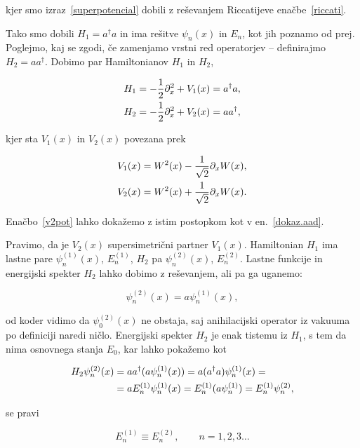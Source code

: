 \ni kjer smo izraz~\eqref{superpotencial} dobili z re\v sevanjem Riccatijeve ena\v cbe~\eqref{riccati}.

Tako smo dobili $H_1 = a^\dagger a$ in ima re\v sitve $\psi_n(x)$ in $E_n$, kot jih poznamo
od prej. Poglejmo, kaj se zgodi, \v ce zamenjamo vrstni red operatorjev -- definirajmo $H_2 = aa^\dagger$.
Dobimo par Hamiltonianov $H_1$ in $H_2$,

\begin{align}
	H_1 &= -\frac{1}{2}\partial_x^2 + V_1(x) = a^\dagger a, \\
	H_2 &= -\frac{1}{2}\partial_x^2 + V_2(x) = aa^\dagger,
\end{align}

\ni kjer sta $V_1(x)$ in $V_2(x)$ povezana prek

\begin{align}
	V_1(x) &= W^2(x) - \frac{1}{\sqrt{2}}\partial_x W(x), \notag \\
	V_2(x) &= W^2(x) + \frac{1}{\sqrt{2}}\partial_x W(x). \label{v2pot}
\end{align}

\ni Ena\v cbo~\eqref{v2pot} lahko doka\v zemo z istim postopkom kot v en.~\eqref{dokaz.aad}.

Pravimo, da je $V_2(x)$ supersimetri\v cni partner $V_1(x)$. Hamiltonian $H_1$ ima lastne pare $\psi^{(1)}_n(x)$,
$E^{(1)}_n$, $H_2$ pa $\psi^{(2)}_n(x)$, $E^{(2)}_n$. Lastne funkcije in energijski spekter $H_2$ lahko dobimo z
re\v sevanjem, ali pa ga uganemo:

\begin{equation}
	\psi^{(2)}_n(x) = a\psi^{(1)}_n(x),
\end{equation}

\ni od koder vidimo da $\psi^{(2)}_0(x)$ ne obstaja, saj anihilacijski operator iz vakuuma po definiciji naredi
ni\v clo. Energijski spekter $H_2$ je enak tistemu iz $H_1$, s tem da nima osnovnega stanja $E_0$, kar lahko
poka\v zemo kot

\begin{align}
	H_2\psi^{(2)}_n(x) &= aa^\dagger (a\psi^{(1)}_n(x)) = a(a^\dagger a)\psi^{(1)}_n(x) = \notag \\
		&= aE^{(1)}_n\psi^{(1)}_n(x) = E_n^{(1)}(a\psi_n^{(1)}) = E_n^{(1)}\psi_n^{(2)},
	\label{degenener}
\end{align}

\ni se pravi

\begin{equation}
	E^{(1)}_n \equiv E^{(2)}_n, \qquad n = 1, 2, 3 \ldots
\end{equation}

